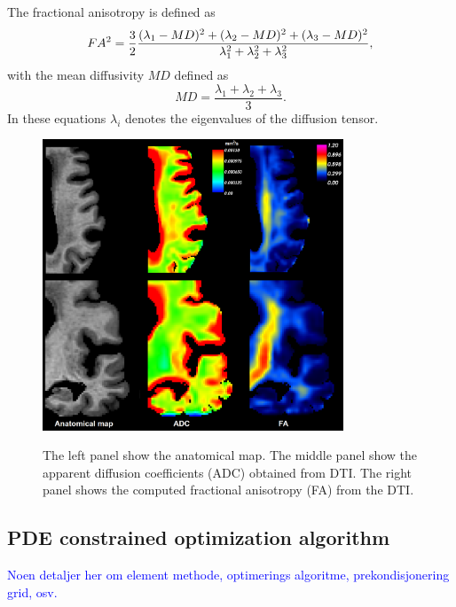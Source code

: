 \documentclass[11pt,a4paper]{article}
\newcommand{\kam}[1]{\textcolor{blue}{#1}}
\begin{document}
The fractional anisotropy is defined as 
\begin{equation}
FA\sp{2} =  \frac{3}{2} \frac{ (\lambda_1 - MD )\sp{2} +(\lambda_2 - MD )\sp{2} +(\lambda_3 - MD )\sp{2}}{\lambda\sp{2}_1 + \lambda\sp{2}_2  +\lambda\sp{2}_3 },
\end{equation}
with the mean diffusivity $MD$ defined as 
\begin{equation}
MD = \frac{\lambda_1 +\lambda_2 +\lambda_3 }{3}.
\end{equation}
In these equations $\lambda_i$ denotes the eigenvalues of the diffusion tensor.
\begin{figure}
\centering
\includegraphics[width=0.80\textwidth]{DTI-zoom.png} 
\label{FIG::DTI} 
\caption{The left panel show the anatomical map. The middle panel show the apparent diffusion coefficients (ADC) obtained from DTI. The right panel shows the computed fractional anisotropy (FA) from the DTI.}
\end{figure}







\subsection{PDE constrained optimization algorithm} 

\kam{
Noen detaljer her om element methode, optimerings algoritme, prekondisjonering
grid, osv. 
}
\end{document}
